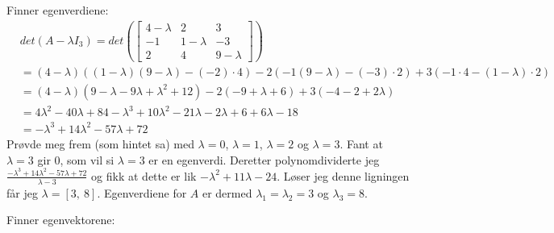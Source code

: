 \documentclass[11pt, a4paper, norsk]{NTNUoving}
\begin{document}
\begin{oppgave}
\begin{punkt}
            Finner egenverdiene:
            \begin{align*}
                &det(A - \lambda I_{3}) = det\left(\begin{bmatrix}
                        4-\lambda & 2 & 3 \\
                        -1 & 1 - \lambda & -3 \\
                        2 & 4 & 9 - \lambda
                \end{bmatrix}\right)
                \\
                                       &= (4- \lambda)((1-\lambda)(9-\lambda) - (-2)\cdot 4) - 2 (-1(9-\lambda) - (-3) \cdot 2) + 3(-1\cdot 4 - (1 - \lambda)\cdot 2)
                                       \\
                                       &= (4-\lambda)(9 - \lambda - 9\lambda + \lambda^2 +12) -2(-9 + \lambda + 6) + 3(-4-2+2\lambda)
                                       \\
                                       &= 4\lambda^2 - 40\lambda + 84 -\lambda^3 +10\lambda^2 - 21\lambda - 2\lambda + 6 + 6\lambda - 18
                                       \\
                                       &= -\lambda^3 + 14\lambda^2 - 57\lambda + 72
            \end{align*}
            Prøvde meg frem (som hintet sa) med $\lambda = 0$, $\lambda = 1$, $\lambda = 2$ og $\lambda = 3$. Fant at $\lambda = 3$ gir 0, som vil si $\lambda = 3$ er en egenverdi. Deretter polynomdividerte jeg $\frac{-\lambda^3 + 14\lambda^2 - 57\lambda + 72}{\lambda - 3}$ og fikk at dette er lik $-\lambda^2 + 11\lambda - 24$. Løser jeg denne ligningen får jeg $\lambda = \left[ 3, \  8\right]$. Egenverdiene for $A$ er dermed $\lambda_1 = \lambda_2 = 3$ og $\lambda_3 = 8$.

            Finner egenvektorene:
            

\end{punkt}
\end{oppgave}
\end{document}
